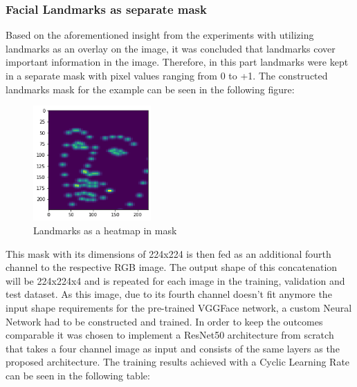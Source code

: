 \subsubsection{Facial Landmarks as separate mask}
Based on the aforementioned insight from the experiments with utilizing landmarks as an overlay on the image, it was concluded that landmarks cover important information in the image. Therefore, in this part landmarks were kept in a separate mask with pixel values ranging from 0 to +1. The constructed landmarks mask for the example can be seen in the following figure:

\begin{figure}[H]
  \begin{center}
  \includegraphics[angle=0, width=0.4\textwidth]{Figures/landmarks_as_heatmap_in_mask.png}
  \caption{Landmarks as a heatmap in mask}
  \label{fig:LandmarksMask}
  \end{center}
\end{figure}

This mask with its dimensions of 224x224 is then fed as an additional fourth channel to the respective RGB image. The output shape of this concatenation will be 224x224x4 and is repeated for each image in the training, validation and test dataset.
\newline\newline
As this image, due to its fourth channel doesn't fit anymore the input shape requirements for the pre-trained VGGFace network, a custom Neural Network had to be constructed and trained. In order to keep the outcomes comparable it was chosen to implement a ResNet50 architecture from scratch that takes a four channel image as input and consists of the same layers as the proposed architecture. The training results achieved with a Cyclic Learning Rate can be seen in the following table:

